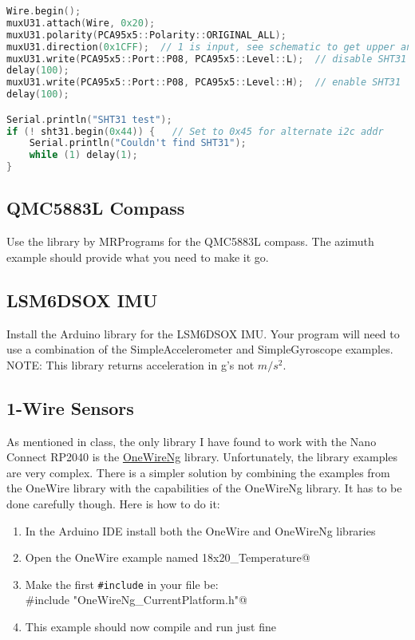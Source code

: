 \begin{lstlisting}[caption={This listing shows how to reset the SHT31.},
label={lst:sht31reset},language=C++]
Wire.begin();
muxU31.attach(Wire, 0x20);
muxU31.polarity(PCA95x5::Polarity::ORIGINAL_ALL);
muxU31.direction(0x1CFF);  // 1 is input, see schematic to get upper and lower bytes
muxU31.write(PCA95x5::Port::P08, PCA95x5::Level::L);  // disable SHT31
delay(100);
muxU31.write(PCA95x5::Port::P08, PCA95x5::Level::H);  // enable SHT31
delay(100);

Serial.println("SHT31 test");
if (! sht31.begin(0x44)) {   // Set to 0x45 for alternate i2c addr
    Serial.println("Couldn't find SHT31");
    while (1) delay(1);
}
\end{lstlisting}

\subsection{QMC5883L Compass}
Use the library by MRPrograms for the QMC5883L compass. The azimuth example 
should provide what you need to make it go.

\subsection{LSM6DSOX IMU}
Install the Arduino library for the LSM6DSOX IMU. Your program will need 
to use a combination of the SimpleAccelerometer and SimpleGyroscope examples.
NOTE: This library returns acceleration in g's not $m/s^2$.

\subsection{1-Wire Sensors}
As mentioned in class, the only library I have found to work with the Nano Connect 
RP2040 is the \href{https://github.com/pstolarz/OneWireNg}{OneWireNg} library. 
Unfortunately, the library examples are very complex. There is a simpler solution by 
combining the examples from the OneWire library with the capabilities of the OneWireNg 
library. It has to be done carefully though. Here is how to do it:
\begin{enumerate}
    \item In the Arduino IDE install both the OneWire and OneWireNg libraries
    \item Open the OneWire example named \lstinline@DS18x20_Temperature@ 
    \item Make the first \lstinline|#include| in your file be:\\
            \lstinline@#include "OneWireNg_CurrentPlatform.h"@ 
    \item This example should now compile and run just fine 
\end{enumerate}

